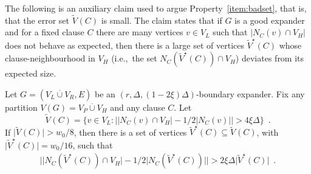 \documentclass{article}
\providecommand{\abs}[1]{\lvert#1\rvert}
\providecommand{\Abs}[1]{\bigl\lvert#1\bigr\rvert}
\newcommand{\set}[1]{\{ #1 \}}
\newcommand{\setsize}[1]{\lvert#1\rvert}
\newcommand{\disjointunion}{\overset{.}{\cup}}
\newcommand{\eqperiod}{\enspace .}
\newcommand{\ie}{i.e.,\ }
\newcommand{\neigh}[2][]{N_{{#1}}(#2)}
\newcommand{\diff}{\xi}
\newcommand{\GdegMax}{\Delta}
\newcommand{\V}[1][]{V_{#1}}
\newcommand{\Vl}{\V[L]}
\newcommand{\Vr}{\V[R]}
\newcommand{\Vp}{\V[P]}
\newcommand{\Vh}{\V[H]}
\newcommand{\Vbad}[2][]{\widetilde V^{#1}(#2)}
\numberwithin{equation}{section}
\begin{document}
The following is an auxiliary claim used to argue
Property~\ref{item:badset}, that is, that the error set $\Vbad{C}$ is
small. The claim states that if $G$ is a good expander and for a fixed
clause $C$ there are many vertices $v \in \Vl$ such that
$\setsize{\neigh[C]{v} \cap \Vh}$ does not behave as expected, then
there is a large set of vertices $\Vbad[\star]{C}$ whose
clause-neighbourhood in $\Vh$ (\ie the set
$\neigh[C]{\Vbad[\star]{C}} \cap \Vh$) deviates from its expected
size.

\begin{claim}\label{cl:non_expansion}
  Let $G=( \Vl \disjointunion \Vr, E)$ be an 
  $(r, \GdegMax, \left(1 - 2\diff \right)\GdegMax)$-boundary 
  expander.
  Fix any partition $V(G) = \Vp \disjointunion \Vh$ and any clause $C$.
  Let
  \begin{equation*}
    \Vbad{C} = \set{v \in \Vl :
      \Abs{ \abs{ \neigh[C]{v} \cap \Vh } - 
        1/2\abs{ \neigh[C]{v} } } > 
      4 \diff \GdegMax} \eqperiod
  \end{equation*}
  If $\setsize{ \Vbad{C} } > w_0/8$, then there is a set
  of vertices $\Vbad[\star]{C} \subseteq \Vbad{C}$, with 
  $\setsize{ \Vbad[\star]{C} } = w_0/16$, such that
  \begin{align*}
    \Abs{ \abs{ \neigh[C]{\Vbad[\star]{C} } \cap \Vh } -
    1/2\abs{ \neigh[C]{ \Vbad[\star]{C} } }} >
    2 \diff \GdegMax \setsize{ \Vbad[\star]{C} } \eqperiod
  \end{align*}
\end{claim}
\end{document}
